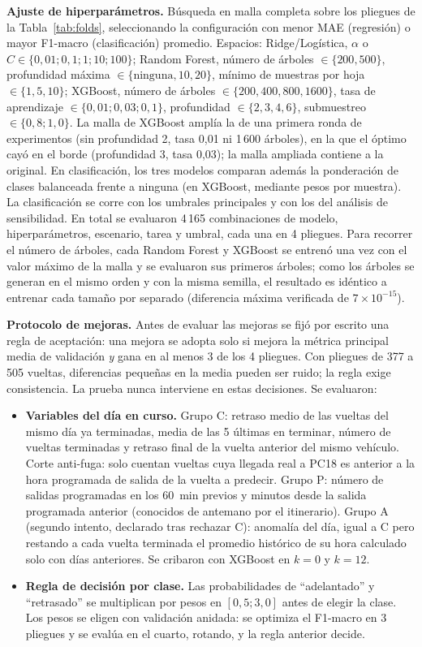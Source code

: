\documentclass[conference]{IEEEtran}
\begin{document}
\textbf{Ajuste de hiperparámetros.} Búsqueda en malla completa sobre los pliegues de la Tabla~\ref{tab:folds}, seleccionando la configuración con menor MAE (regresión) o mayor F1-macro (clasificación) promedio. Espacios: Ridge/Logística, $\alpha$ o $C \in \{0{,}01; 0{,}1; 1; 10; 100\}$; Random Forest, número de árboles $\in \{200, 500\}$, profundidad máxima $\in \{\text{ninguna}, 10, 20\}$, mínimo de muestras por hoja $\in \{1, 5, 10\}$; XGBoost, número de árboles $\in \{200, 400, 800, 1600\}$, tasa de aprendizaje $\in \{0{,}01; 0{,}03; 0{,}1\}$, profundidad $\in \{2, 3, 4, 6\}$, submuestreo $\in \{0{,}8; 1{,}0\}$. La malla de XGBoost amplía la de una primera ronda de experimentos (sin profundidad 2, tasa 0,01 ni 1\,600 árboles), en la que el óptimo cayó en el borde (profundidad 3, tasa 0,03); la malla ampliada contiene a la original. En clasificación, los tres modelos comparan además la ponderación de clases balanceada frente a ninguna (en XGBoost, mediante pesos por muestra). La clasificación se corre con los umbrales principales y con los del análisis de sensibilidad. En total se evaluaron 4\,165 combinaciones de modelo, hiperparámetros, escenario, tarea y umbral, cada una en 4 pliegues. Para recorrer el número de árboles, cada Random Forest y XGBoost se entrenó una vez con el valor máximo de la malla y se evaluaron sus primeros árboles; como los árboles se generan en el mismo orden y con la misma semilla, el resultado es idéntico a entrenar cada tamaño por separado (diferencia máxima verificada de $7 \times 10^{-15}$).

\textbf{Protocolo de mejoras.} Antes de evaluar las mejoras se fijó por escrito una regla de aceptación: una mejora se adopta solo si mejora la métrica principal media de validación \emph{y} gana en al menos 3 de los 4 pliegues. Con pliegues de 377 a 505 vueltas, diferencias pequeñas en la media pueden ser ruido; la regla exige consistencia. La prueba nunca interviene en estas decisiones. Se evaluaron:
\begin{itemize}
\item \textbf{Variables del día en curso.} Grupo C: retraso medio de las vueltas del mismo día ya terminadas, media de las 5 últimas en terminar, número de vueltas terminadas y retraso final de la vuelta anterior del mismo vehículo. Corte anti-fuga: solo cuentan vueltas cuya llegada real a PC18 es anterior a la hora programada de salida de la vuelta a predecir. Grupo P: número de salidas programadas en los 60~min previos y minutos desde la salida programada anterior (conocidos de antemano por el itinerario). Grupo A (segundo intento, declarado tras rechazar C): anomalía del día, igual a C pero restando a cada vuelta terminada el promedio histórico de su hora calculado solo con días anteriores. Se cribaron con XGBoost en $k = 0$ y $k = 12$.
\item \textbf{Regla de decisión por clase.} Las probabilidades de ``adelantado'' y ``retrasado'' se multiplican por pesos en $[0{,}5; 3{,}0]$ antes de elegir la clase. Los pesos se eligen con validación anidada: se optimiza el F1-macro en 3 pliegues y se evalúa en el cuarto, rotando, y la regla anterior decide.
\end{itemize}
\end{document}
